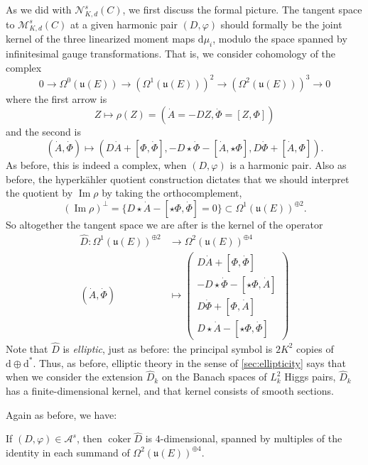 \documentclass[12pt,letterpaper,reqno]{article}
\numberwithin{equation}{section}
\newcommand{\fu}{{\mathfrak u}}
\newcommand{\cM}{\ensuremath{\mathcal M}}
\newcommand{\cN}{\ensuremath{\mathcal N}}
\newcommand{\cA}{\ensuremath{\mathcal A}}
\newcommand{\hk}{hyperk\"ahler\xspace}
\newcommand{\de}{\mathrm{d}}
\newcommand{\ti}[1]{\textit{#1}}
\DeclareMathOperator{\im}{Im}
\DeclareMathOperator{\coker}{coker}
\newcommand{\fixme}[1]{{\color{orange}{[#1]}}}
\begin{document}
As we did with $\cN^s_{K,d}(C)$, we
first discuss the formal picture. The tangent space to
$\cM_{K,d}^s(C)$ at a given harmonic pair $(D,\varphi)$
should formally be the joint kernel of the
three linearized moment maps $\de \mu_i$, modulo the space spanned
by infinitesimal gauge transformations.
That is, we consider cohomology of the complex
\begin{equation}
  0 \to \Omega^0(\fu(E)) \to (\Omega^{1}(\fu(E)))^2 \to (\Omega^2(\fu(E)))^3 \to 0
\end{equation}
where the first arrow is
\begin{equation}
 Z \mapsto \rho(Z) = (\dot A = -D Z, \dot \Phi = [Z,\Phi])
\end{equation}
and the second is
\begin{equation}
(\dot A, \dot \Phi) \mapsto (D \dot{A} + [\Phi,\dot\Phi], -D \star \dot\Phi - [\dot A, \star\Phi], D \dot\Phi + [\dot A, \Phi]).
\end{equation}
As before, this is indeed a complex, when $(D,\varphi)$ is a harmonic
pair. Also as before, the \hk quotient construction dictates that
we should interpret the quotient by $\im \rho$
by taking the orthocomplement, \fixme{double-check signs and factors here!}
\begin{equation}
  (\im \rho)^\perp = \{D \star \dot{A} - [\star \Phi, \dot\Phi] = 0\} \subset \Omega^1(\fu(E))^{\oplus 2}.
\end{equation}
So altogether the tangent space we are after is the kernel of
the operator
\begin{align}
\hat{D}: \Omega^1(\fu(E))^{\oplus 2} &\to \Omega^2(\fu(E))^{\oplus 4} \\
(\dot A, \dot \Phi) &\mapsto \begin{pmatrix} D \dot{A} + [\Phi,\dot\Phi] \\ -D \star \dot\Phi - [\star \Phi, \dot A] \\ D \dot\Phi + [\Phi, \dot A] \\ D \star \dot{A} - [\star \Phi, \dot \Phi] \end{pmatrix}
\end{align}
Note that $\hat{D}$ is \ti{elliptic}, just as before:
the principal symbol is $2K^2$ copies of $\de \oplus \de^*$.
Thus, as before, elliptic theory in the sense of \autoref{sec:ellipticity}
says that when we
consider the extension $\hat{D}_k$ on the Banach spaces of $L^2_k$
Higgs pairs, $\hat{D}_k$ has a finite-dimensional
kernel, and that kernel consists of smooth sections.

Again as before, we have:
\begin{lem} If $(D,\varphi) \in \cA^s$, then $\coker \hat{D}$ is $4$-dimensional,
spanned by multiples of the identity in each summand
of $\Omega^2(\fu(E))^{\oplus 4}$.
\end{lem}
\end{document}
